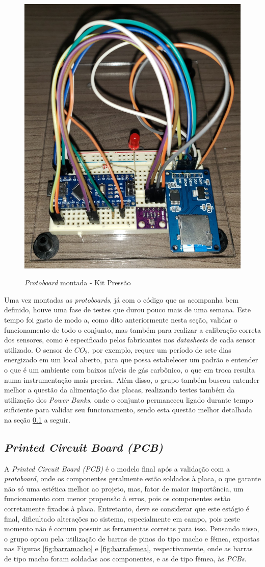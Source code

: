 \documentclass[acronym,symbols,table]{fei}
\begin{document}
\begin{figure}[!htb]
\centering
    \caption{\textit{Protoboard} montada - Kit Pressão}
    \includegraphics[width=0.45\linewidth]{Imagens/protoboardpressao.jpeg}
    \label{fig:protopressao}
\end{figure}

Uma vez montadas as \textit{protoboards}, já com o código que as acompanha bem definido, houve uma fase de testes que durou pouco mais de uma semana. Este tempo foi gasto de modo a, como dito anteriormente nesta seção, validar o funcionamento de todo o conjunto, mas também para realizar a calibração correta dos sensores, como é especificado pelos fabricantes nos \textit{datasheets} de cada sensor utilizado. O sensor de ${CO}_{2}$, por exemplo, requer um período de sete dias energizado em um local aberto, para que possa estabelecer um padrão e entender o que é um ambiente com baixos níveis de gás carbônico, o que em troca resulta numa instrumentação mais precisa. Além disso, o grupo também buscou entender melhor a questão da alimentação das placas, realizando testes também da utilização dos \textit{Power Banks}, onde o conjunto permaneceu ligado durante tempo suficiente para validar seu funcionamento, sendo esta questão melhor detalhada na seção \ref{PCB} a seguir.

\newpage

\subsection{\textit{Printed Circuit Board (PCB)}} \label{PCB}

A \textit{Printed Circuit Board (PCB)} é o modelo final após a validação com a \textit{protoboard}, onde os componentes geralmente estão soldados à placa, o que garante não só uma estética melhor ao projeto, mas, fator de maior importância, um funcionamento com menor propensão à erros, pois os componentes estão corretamente fixados à placa. Entretanto, deve se considerar que este estágio é final, dificultado alterações no sistema, especialmente em campo, pois neste momento não é comum possuir as ferramentas corretas para isso. Pensando nisso, o grupo optou pela utilização de barras de pinos do tipo macho e fêmea, expostas nas Figuras \ref{fig:barramacho} e \ref{fig:barrafemea}, respectivamente, onde as barras de tipo macho foram soldadas aos componentes, e as de tipo fêmea, às \textit{PCBs}.
\end{document}
